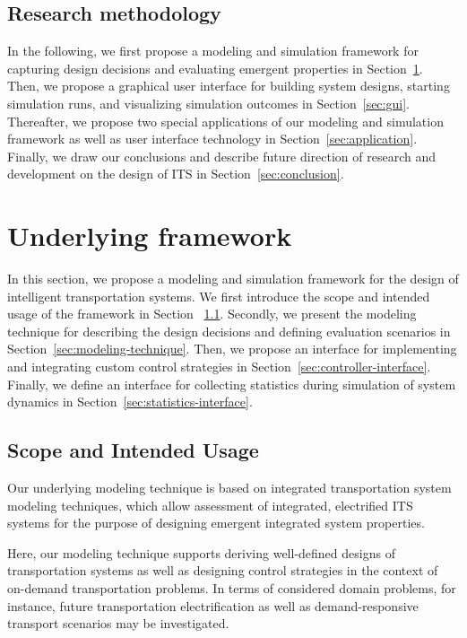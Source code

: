 \documentclass[10pt,twocolumn]{article}
\begin{document}
\subsection{Research methodology}

In the following, we first propose a modeling and simulation framework for capturing design decisions and evaluating emergent properties in Section~\ref{sec:framework}.
Then, we propose a graphical user interface for building system designs, starting simulation runs, and visualizing simulation outcomes in Section~\ref{sec:gui}.
Thereafter, we propose two special applications of our modeling and simulation framework as well as user interface technology in Section~\ref{sec:application}.
Finally, we draw our conclusions and describe future direction of research and development on the design of ITS in Section~\ref{sec:conclusion}. 

\section{Underlying framework}
\label{sec:framework}

In this section, we propose a modeling and simulation framework for the design of intelligent transportation systems.
We first introduce the scope and intended usage of the framework in Section ~\ref{sec:scope}.
Secondly, we present the modeling technique for describing the design decisions and defining evaluation scenarios in Section~\ref{sec:modeling-technique}.
Then, we propose an interface for implementing and integrating custom control strategies in Section~\ref{sec:controller-interface}.
Finally, we define an interface for collecting statistics during simulation of system dynamics in Section~\ref{sec:statistics-interface}.

\subsection{Scope and Intended Usage}
\label{sec:scope}
Our underlying modeling technique is based on integrated transportation system modeling techniques, which allow assessment of integrated, electrified ITS systems for the purpose of designing emergent integrated system properties.

Here, our modeling technique supports deriving well-defined designs of transportation systems as well as designing control strategies in the context of on-demand transportation problems. In terms of considered domain problems, for instance, future transportation electrification as well as demand-responsive transport scenarios may be investigated.
\end{document}
